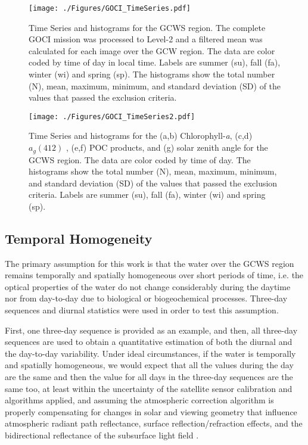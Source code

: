 \documentclass[remotesensing,article,submit,moreauthors,pdftex,10pt,a4paper]{Definitions/mdpi}
\begin{document}
\begin{figure}[htbp!]
  \centering
    \texttt{[image: ./Figures/GOCI\_TimeSeries.pdf]}
    \vspace{-0.5cm}
    \caption{Time Series and histograms for the GCWS region. The complete GOCI mission was processed to Level-2 and a filtered mean was calculated for each image over the GCW region. The data are color coded by time of day in local time. Labels are summer (su), fall (fa), winter (wi) and spring (sp). The histograms show the total number (N), mean, maximum, minimum, and standard deviation (SD) of the values that passed the exclusion criteria. \label{fig:GOCI_TimeSeries} } 
\end{figure}
\begin{figure}[htbp!]

  \centering
    \texttt{[image: ./Figures/GOCI\_TimeSeries2.pdf]}
    \caption{Time Series and histograms for the (a,b) Chlorophyll-{\it a}, (c,d) $a_g(412)$ , (e,f) POC products, and (g) solar zenith angle for the GCWS region. The data are color coded by time of day. The histograms show the total number (N), mean, maximum, minimum, and standard deviation (SD) of the values that passed the exclusion criteria. Labels are summer (su), fall (fa), winter (wi) and spring (sp). \label{fig:GOCI_TimeSeries2} } 
\end{figure}
\subsection{Temporal Homogeneity}
The primary assumption for this work is that the water over the GCWS region remains temporally and spatially homogeneous over short periods of time, i.e. the optical properties of the water do not change considerably during the daytime nor from day-to-day due to biological or biogeochemical processes. Three-day sequences and diurnal statistics were used in order to test this assumption. 

First, one three-day sequence is provided as an example, and then, all three-day sequences are used to obtain a quantitative estimation of both the diurnal and the day-to-day variability. Under ideal circumstances, if the water is temporally and spatially homogeneous, we would expect that all the values during the day are the same and then the value for all days in the three-day sequences are the same too, at least within the uncertainty of the satellite sensor calibration and algorithms applied, and assuming the atmospheric correction algorithm is properly compensating for changes in solar and viewing geometry that influence atmospheric radiant path reflectance, surface reflection/refraction effects, and the bidirectional reflectance of the subsurface light field \cite{Mobley2016}. 
\end{document}
